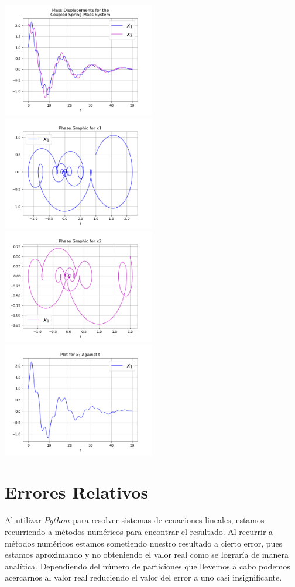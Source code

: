 \documentclass{article}
\begin{document}
\begin{center}
\includegraphics[height=5cm]{ejemplo2_4_pt1.png}
\includegraphics[height=5cm]{ejemplo2_4_pt2.png}
\includegraphics[height=5cm]{ejemplo2_4_pt3.png}
\includegraphics[height=5cm]{ejemplo2_4_pt4.png}
\end{center}


\section{Errores Relativos}
Al utilizar $Python$ para resolver sistemas de ecuaciones lineales, estamos recurriendo a métodos numéricos para encontrar el resultado. Al recurrir a métodos numéricos estamos sometiendo nuestro resultado a cierto error, pues estamos aproximando y no obteniendo el valor real como se lograría de manera analítica. Dependiendo del número de particiones que llevemos a cabo podemos acercarnos al valor real reduciendo el valor del error a uno casi insignificante.
\end{document}
